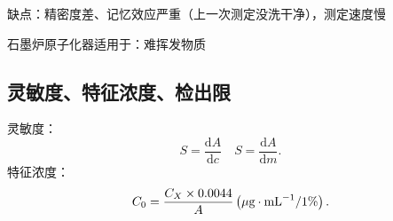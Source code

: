 缺点：精密度差、记忆效应严重（上一次测定没洗干净），测定速度慢
\begin{notation}
    石墨炉原子化器适用于：难挥发物质
\end{notation}
\subsection{灵敏度、特征浓度、检出限}%
\label{sub:灵敏度、特征浓度、检出限}
\begin{notation}
    灵敏度：
    \[
        S = \frac{\mathrm{d}A}{\mathrm{d}c} \quad S = \frac{\mathrm{d}A}{\mathrm{d}m}
    .\]
    特征浓度：
    \[
        C_0 = \frac{C_{X}\times 0.0044}{A} \left( \mu \text{g}\cdot \ce{mL}^{-1}/1\% \right)
    .\]
\end{notation}

